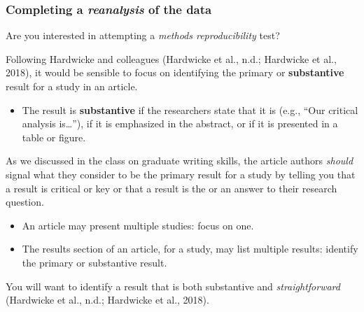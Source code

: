 \documentclass[
  letterpaper,
  DIV=11,
  numbers=noendperiod]{scrreprt}
\providecommand{\tightlist}{%
  \setlength{\itemsep}{0pt}\setlength{\parskip}{0pt}}\usepackage{longtable,booktabs,array}
\begin{document}
\hypertarget{sec-try-repro}{%
\subsubsection{\texorpdfstring{Completing a \emph{reanalysis} of the
data}{Completing a reanalysis of the data}}\label{sec-try-repro}}

Are you interested in attempting a \emph{methods reproducibility} test?

Following Hardwicke and colleagues (Hardwicke et al., n.d.; Hardwicke et
al., 2018), it would be sensible to focus on identifying the primary or
\textbf{substantive} result for a study in an article.

\begin{itemize}
\tightlist
\item
  The result is \textbf{substantive} if the researchers state that it is
  (e.g., ``Our critical analysis is\ldots{}''), if it is emphasized in
  the abstract, or if it is presented in a table or figure.
\end{itemize}

As we discussed in the class on graduate writing skills, the article
authors \emph{should} signal what they consider to be the primary result
for a study by telling you that a result is critical or key or that a
result is the or an answer to their research question.

\begin{tcolorbox}[enhanced jigsaw, opacitybacktitle=0.6, title=\textcolor{quarto-callout-tip-color}{\faLightbulb}\hspace{0.5em}{Tip}, arc=.35mm, colbacktitle=quarto-callout-tip-color!10!white, colframe=quarto-callout-tip-color-frame, leftrule=.75mm, opacityback=0, breakable, titlerule=0mm, left=2mm, bottomrule=.15mm, toprule=.15mm, colback=white, coltitle=black, bottomtitle=1mm, toptitle=1mm, rightrule=.15mm]

\begin{itemize}
\tightlist
\item
  An article may present multiple studies: focus on one.
\item
  The results section of an article, for a study, may list multiple
  results: identify the primary or substantive result.
\end{itemize}

\end{tcolorbox}

You will want to identify a result that is both substantive and
\emph{straightforward} (Hardwicke et al., n.d.; Hardwicke et al., 2018).
\end{document}
